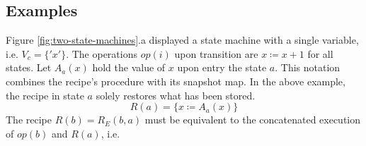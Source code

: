 \documentclass[12pt,a4paper]{scrartcl}
\begin{document}
\subsection{Examples}
                 
Figure \ref{fig:two-state-machines}.a displayed a state machine with a single
variable, i.e. $V_c=\{'x'\}$. The operations $op(i)$ upon transition are
$x\coloneqq x+1$ for all states. Let $A_a(x)$ hold the value of $x$ upon entry the
state $a$.  This notation combines the recipe's procedure with its snapshot
map.  In the above example, the recipe in state $a$ solely restores what has
been stored.
\begin{equation} 
    R(a) = \{ x \coloneqq  A_a(x) \} 
\end{equation}
The recipe $R(b)=R_E(b,a)$ must be equivalent to the concatenated execution of $op(b)$
and $R(a)$, i.e.
\end{document}
